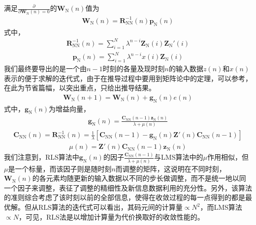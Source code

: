 满足$\frac{\partial}{\partial\mathbf{W}_{\mathrm{N}}(n)=0}$的$\mathbf{W}_{\mathrm{N}}(n)$值为
\begin{eqnarray}
    \mathbf{W}_{\mathrm{N}}(n)=\mathbf{R}^{-1}_{\mathrm{NN}}(n)\mathbf{p}_{\mathrm{N}}(n)
    \label{equ:2.25}
\end{eqnarray}
式中，
  \begin{eqnarray}
      \mathbf{R}^{-1}_{\mathrm{NN}}(n)=\sum_{i=1}^N\lambda^{n-i}\mathbf{Z}_{\mathrm{N}}(i){\mathbf{Z}_{\mathrm{N}}}'(i)  
    \label{equ:2.26}
\end{eqnarray}
\begin{eqnarray}
    \mathbf{p}_{\mathrm{N}}(n)=\sum_{i=1}^N\lambda^{n-i}x(i)\mathbf{Z}_{\mathrm{N}}(i)
    \label{equ:2.27}
\end{eqnarray}
我们最终要导出的是一个由$n-1$时刻的各量及现时刻$n$的输入数据$z(n)$和$x(n)$表示的便于求解的迭代式，由于在推导过程中要用到矩阵论中的定理，可以参考，在此为节省篇幅，以突出重点，只给出推导结果。
\begin{eqnarray}
    \mathbf{W}_{\mathrm{N}}(n+1)=\mathbf{W}_{\mathrm{N}}(n)+\mathbf{g}_{\mathrm{N}}(n)e(n)
    \label{equ:2.28}
\end{eqnarray}
式中，$\mathbf{g}_{\mathrm{N}}(n)$为增益向量，
\begin{eqnarray}
    \mathbf{g}_{\mathrm{N}}(n)=\frac{\mathbf{C}_{\mathrm{NN}}(n-1)\mathbf{z}_{\mathrm{N}}(n)}{\lambda+\mu(n)}
    \label{equ:2.29}
\end{eqnarray}
\begin{eqnarray}
    \mathbf{C}_{\mathrm{NN}}(n)=\mathbf{R}^{-1}_{\mathrm{NN}}(n)=\frac{1}{\lambda}[\mathbf{C}_{\mathrm{NN}}(n-1)-\mathbf{g}_{\mathrm{N}}(n){\mathbf{Z}}'(n)\mathbf{C}_{\mathrm{NN}}(n-1)]
    \label{equ:2.30}
\end{eqnarray}
\begin{eqnarray}
    \mu(n)={\mathbf{Z}}'(n)\mathbf{C}_{\mathrm{NN}}(n-1)\mathbf{z}_{\mathrm{N}}(n)
    \label{equ:2.31}
\end{eqnarray}
我们注意到，RLS算法中$\mathbf{g}_{\mathrm{N}}(n)$的因子$\frac{\mathbf{C}_{\mathrm{NN}}(n-1)}{\lambda+\mu(n)}$与LMS算法中的$\mu$作用相似，但$\mu$是一个标量，而该因子则是随时刻$n$而调整的矩阵，这说明在不同时刻，$\mathbf{W}_{\mathrm{N}}(n)$的各元素均随更新的输入数据以不同的步长做调整，而不是统一地以同一个因子来调整，表征了调整的精细性及新信息数据利用的充分性。另外，该算法的准则综合考虑了该时刻以前的全部信息，使得在收敛过程的每一点得到的都是最优解。但从RLS算法的迭代式可以看出，其码元间的计算量$\propto
N^2$，而LMS算法$\propto
N$，可见，RLS法是以增加计算量为代价换取好的收敛性能的。

